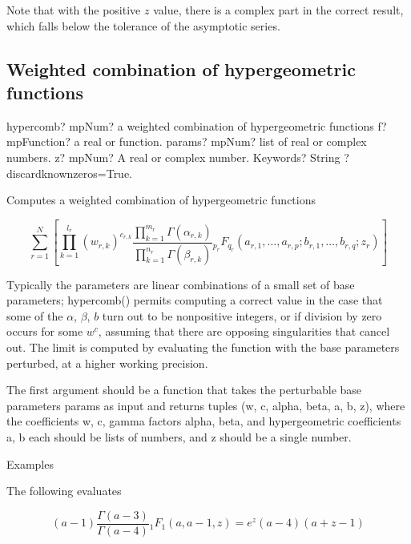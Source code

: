 Note that with the positive $z$ value, there is a complex part in the correct result, which falls below the tolerance of the asymptotic series.




\subsection{Weighted combination of hypergeometric functions}

\begin{mpFunctionsExtract}
	\mpFunctionFour
	{hypercomb? mpNum? a weighted combination of hypergeometric functions}
	{f? mpFunction? a real or function.}
	{params? mpNum? list of real or complex numbers.}
	{z? mpNum? A real or complex number.}
	{Keywords? String ? discardknownzeros=True.}			
\end{mpFunctionsExtract}

\vpara
Computes a weighted combination of hypergeometric functions

\begin{equation}
\sum_{r=1}^N \left[\prod_{k=1}^{l_r} (w_{r,k})^{c_{r,k}} \frac{\prod_{k=1}^{m_r}\Gamma(\alpha_{r,k})}{\prod_{k=1}^{n_r}\Gamma(\beta_{r,k})} {}_{p_r}F_{q_r} (a_{r,1},\ldots,a_{r,p}; b_{r,1},\ldots,b_{r,q}; z_r)\right]
\end{equation}

Typically the parameters are linear combinations of a small set of base parameters; hypercomb() permits computing a correct value in the case that some of the $\alpha$, $\beta$, $b$ turn out to be nonpositive integers, or if division by zero occurs for some $w^c$, assuming that there are opposing singularities that cancel out. The limit is computed by evaluating the function with the base parameters perturbed, at a higher working precision.

The first argument should be a function that takes the perturbable base parameters params as input and returns tuples (w, c, alpha, beta, a, b, z), where the coefficients w, c, gamma factors alpha, beta, and hypergeometric coefficients a, b each should be lists of numbers, and z should be a single number.

Examples

The following evaluates

\begin{equation}
(a-1)\frac{\Gamma(a-3)}{\Gamma(a-4)} {}_1F_1(a,a-1,z)=e^z (a-4)(a+z-1)
\end{equation}

